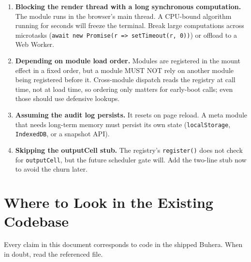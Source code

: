 \documentclass[11pt,a4paper]{article}
\theoremstyle{contract}
\begin{document}
\begin{enumerate}[leftmargin=1.6em,itemsep=2pt]
\item \textbf{Blocking the render thread with a long synchronous
computation.} The module runs in the browser's main thread. A CPU-bound
algorithm running for seconds will freeze the terminal. Break large
computations across microtasks (\texttt{await new Promise(r => setTimeout(r, 0))})
or offload to a Web Worker.

\item \textbf{Depending on module load order.} Modules are registered
in the mount effect in a fixed order, but a module MUST NOT rely on
another module being registered before it. Cross-module dispatch reads
the registry at call time, not at load time, so ordering only matters
for early-boot calls; even those should use defensive lookups.

\item \textbf{Assuming the audit log persists.} It resets on page
reload. A meta module that needs long-term memory must persist its own
state (\texttt{localStorage}, \texttt{IndexedDB}, or a snapshot API).

\item \textbf{Skipping the outputCell stub.} The registry's
\texttt{register()} does not check for \texttt{outputCell}, but the
future scheduler gate will. Add the two-line stub now to avoid the
churn later.
\end{enumerate}

\section{Where to Look in the Existing Codebase}
\label{sec:references}

Every claim in this document corresponds to code in the shipped
Buhera. When in doubt, read the referenced file.
\end{document}
